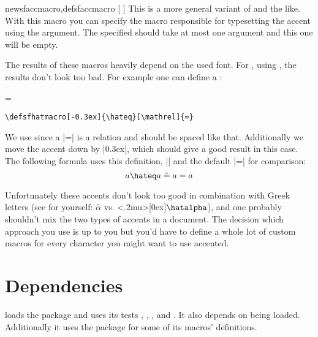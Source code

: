\begin{describemacro}{newsfaccmacro,defsfaccmacro}%
  [%
    \hspace{0pt}%
  ]
  This is a more general variant of  and the like. With this
  macro you can specify the macro responsible for typesetting the accent using
  the  argument. The specified  should take at most
  one argument and this one will be empty.
\end{describemacro}%

The results of these macros heavily depend on the used font. For
, using , the results don't look too bad. For
example one can define a :

\begingroup
{}\hateq[\mathrel]=
\begin{verbatim}
\defsfhatmacro[-0.3ex]{\hateq}[\mathrel]{=}
\end{verbatim}%
We use  since a |=| is a relation and should be spaced like that.
Additionally we move the accent down by |0.3ex|, which should give a good result
in this case. The following formula uses this  definition,
|\mathrel{\hat{=}}| and the default |=| for comparison:
\begin{equation*}
  a\hateq a \mathrel{\hat{=}} a = a
\end{equation*}
\endgroup

Unfortunately these accents don't look too good in combination with Greek
letters (see for yourself: $\hat{\alpha}$ vs.
\begingroup{}<.2mu>[0ex]\hatalpha\alpha$\hatalpha$\endgroup), and
one probably shouldn't mix the two types of accents in a document. The decision
which approach you use is up to you but you'd have to define a whole lot of
custom macros for every character you might want to use accented.

\section{Dependencies}
 loads the  package and uses its tests
, , ,
 and . It also depends on
 being loaded. Additionally it uses the  package for
some of its macros' definitions.

